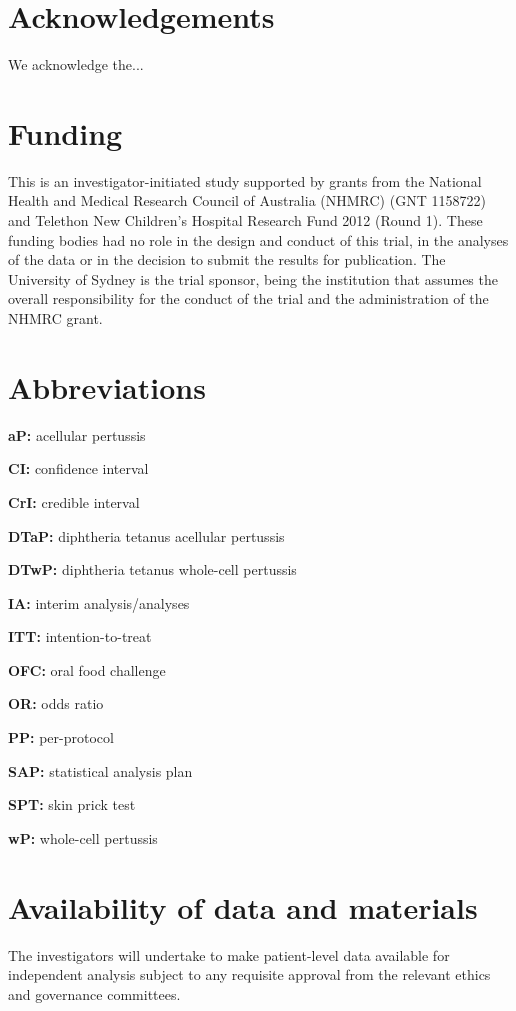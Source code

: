 \documentclass{bmcart}
\begin{document}
\begin{backmatter}

\section*{Acknowledgements}%
We acknowledge the...

\section*{Funding}%
This is an investigator-initiated study supported by grants from the National Health and Medical Research Council of Australia (NHMRC) (GNT 1158722) and Telethon New Children's Hospital Research Fund 2012 (Round 1).
These funding bodies had no role in the design and conduct of this trial, in the analyses of the data or in the decision to submit the results for publication.
The University of Sydney is the trial sponsor, being the institution that assumes the overall responsibility for the conduct of the trial and the administration of the NHMRC grant.

\section*{Abbreviations}%
\textbf{aP:} acellular pertussis

\textbf{CI:} confidence interval

\textbf{CrI:} credible interval

\textbf{DTaP:} diphtheria tetanus acellular pertussis 

\textbf{DTwP:} diphtheria tetanus whole-cell pertussis 

\textbf{IA:} interim analysis/analyses

\textbf{ITT:} intention-to-treat

\textbf{OFC:} oral food challenge

\textbf{OR:} odds ratio

\textbf{PP:} per-protocol

\textbf{SAP:} statistical analysis plan

\textbf{SPT:} skin prick test

\textbf{wP:} whole-cell pertussis

\section*{Availability of data and materials}%
The investigators will undertake to make patient-level data available for independent analysis subject to any requisite approval from the relevant ethics and governance committees.


\end{backmatter}
\end{document}
